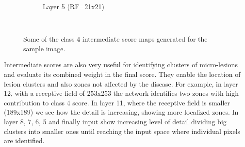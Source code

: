\documentclass[review]{elsarticle}
\theoremstyle{definition} %
\theoremstyle{remark}
\begin{document}
\begin{figure}[!ht]
\begin{subfigure}{0.45\textwidth}
		\caption{Layer 5 (RF=21x21)}
		\label{fig:score_rf21}
	\end{subfigure}\\
	\caption{Some of the class 4 intermediate score maps generated for the sample image.}
	\label{fig:scoremaps2}
\end{figure}

Intermediate scores are also very useful for identifying clusters of micro-lesions and evaluate its combined weight in the final score. They enable the location of lesion clusters and also zones not affected by the disease. For example, in layer 12, with a receptive field of 253x253 the network identifies two zones with high contribution to class 4 score. In layer 11, where the receptive field is smaller (189x189) we see how the detail is increasing, showing more localized zones. In layer 8, 7, 6, 5 and finally input show increasing level of detail dividing big clusters into smaller ones until reaching the input space where individual pixels are identified.
\end{document}
